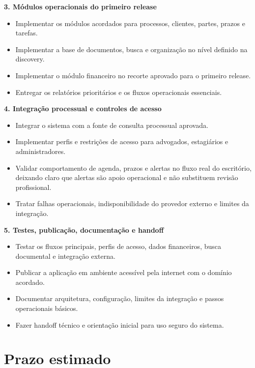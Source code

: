\documentclass[11pt,a4paper]{article}
\begin{document}
\textbf{3. Módulos operacionais do primeiro release}\par

\begin{itemize}
\item Implementar os módulos acordados para processos, clientes, partes, prazos e tarefas.
\item Implementar a base de documentos, busca e organização no nível definido na discovery.
\item Implementar o módulo financeiro no recorte aprovado para o primeiro release.
\item Entregar os relatórios prioritários e os fluxos operacionais essenciais.
\end{itemize}

\textbf{4. Integração processual e controles de acesso}\par

\begin{itemize}
\item Integrar o sistema com a fonte de consulta processual aprovada.
\item Implementar perfis e restrições de acesso para advogados, estagiários e administradores.
\item Validar comportamento de agenda, prazos e alertas no fluxo real do escritório, deixando claro que alertas são apoio operacional e não substituem revisão profissional.
\item Tratar falhas operacionais, indisponibilidade do provedor externo e limites da integração.
\end{itemize}

\textbf{5. Testes, publicação, documentação e handoff}\par

\begin{itemize}
\item Testar os fluxos principais, perfis de acesso, dados financeiros, busca documental e integração externa.
\item Publicar a aplicação em ambiente acessível pela internet com o domínio acordado.
\item Documentar arquitetura, configuração, limites da integração e passos operacionais básicos.
\item Fazer handoff técnico e orientação inicial para uso seguro do sistema.
\end{itemize}

\section*{Prazo estimado}
\end{document}
